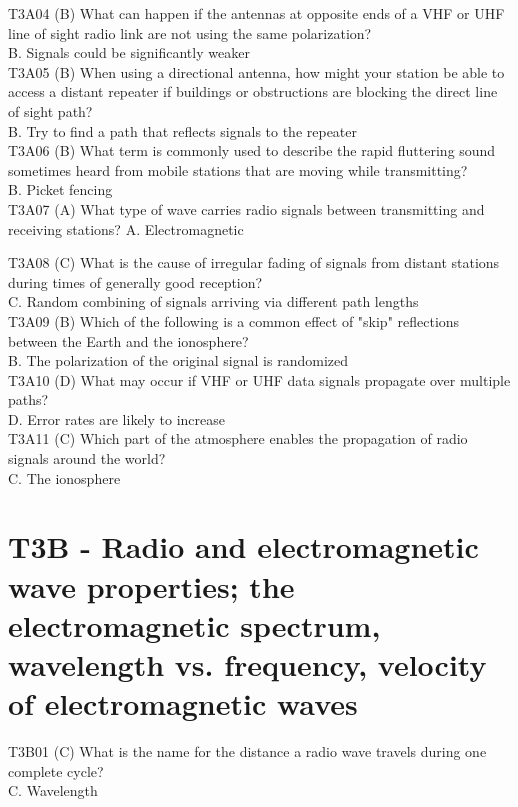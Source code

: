 \documentclass[12pt,letterpaper]{report}
\begin{document}
T3A04 (B) What can happen if the antennas at opposite ends of a VHF or UHF line of sight radio link are not using the same polarization?\\
B. Signals could be significantly weaker\\

T3A05 (B) When using a directional antenna, how might your station be able to access a distant repeater if buildings or obstructions are blocking the direct line of sight path?\\
B. Try to find a path that reflects signals to the repeater\\

T3A06 (B) What term is commonly used to describe the rapid fluttering sound sometimes heard from mobile stations that are moving while transmitting?\\
B. Picket fencing\\

T3A07 (A) What type of wave carries radio signals between transmitting and receiving stations?
A. Electromagnetic

T3A08 (C) What is the cause of irregular fading of signals from distant stations during times of generally good reception?\\
C. Random combining of signals arriving via different path lengths\\

T3A09 (B) Which of the following is a common effect of "skip" reflections between the Earth and the ionosphere?\\
B. The polarization of the original signal is randomized\\

T3A10 (D) What may occur if VHF or UHF data signals propagate over multiple paths?\\
D. Error rates are likely to increase\\

T3A11 (C) Which part of the atmosphere enables the propagation of radio signals around the world?\\
C. The ionosphere\\

\section{T3B - Radio and electromagnetic wave properties; the electromagnetic spectrum, wavelength vs. frequency, velocity of electromagnetic waves}

T3B01 (C) What is the name for the distance a radio wave travels during one complete cycle?\\
C. Wavelength\\
\end{document}

